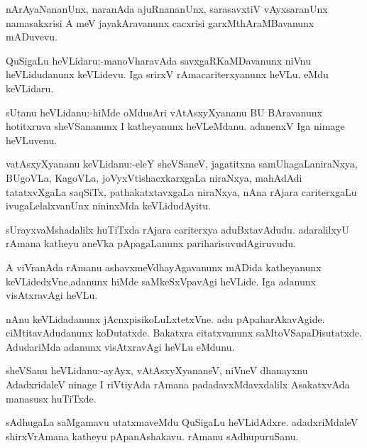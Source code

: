 \documentclass{article}
\begin{document}
\begin{mn}%
nArAyaNananUnx, naranAda ajuRnananUnx, sarasavxtiV vAyxsaranUnx namasakxrisi A meV 
jayakAravanunx cacxrisi garxMthAraMBavanunx mADuvevu.
\end{mn}

\begin{mn}%
QuSigaLu heVLidaru:-manoVharavAda savxgaRKaMDavanunx niVnu heVLidudanunx 
keVLidevu. Iga srirxV rAmacariterxyanunx heVLu. eMdu keVLidaru.
\end{mn}

\begin{mn}%
sUtanu heVLidanu:-hiMde oMdusAri vAtAsxyXyananu BU BAravanunx hotitxruva 
sheVSananunx I katheyanunx heVLeMdanu. adanenxV Iga nimage heVLuvenu.
\end{mn}

\begin{mn}%
vatAsxyXyananu keVLidanu:-eleY sheVSaneV, jagatitxna samUhagaLaniraNxya, BUgoVLa, 
KagoVLa, joVyxVtishacxkarxgaLa niraNxya, mahAdAdi tatatxvXgaLa saqSiTx, 
pathakatxtavxgaLa niraNxya, nAna rAjara cariterxgaLu ivugaLelalxvanUnx nininxMda 
keVLidudAyitu.
\end{mn}

\begin{mn}%
sUrayxvaMshadalilx huTiTxda rAjara cariterxya aduBxtavAdudu. adaralilxyU rAmana 
katheyu aneVka pApagaLanunx pariharisuvudAgiruvudu.
\end{mn}

\begin{mn}%
A viVranAda rAmanu ashavxmeVdhayAgavanunx mADida katheyanunx keVLidedxVne.adanunx 
hiMde saMkeSxVpavAgi heVLide. Iga adanunx visAtxravAgi heVLu.
\end{mn}

\begin{mn}%
nAnu keVLidadanunx jAcnxpisikoLuLxtetxVne. adu pApaharAkavAgide. 
ciMtitavAdudanunx koDutatxde. Bakatxra citatxvanunx saMtoVSapaDisutatxde. 
AdudariMda adanunx visAtxravAgi heVLu eMdunu.
\end{mn}

\begin{mn}%
sheVSanu heVLidanu:-ayAyx, vAtAsxyXyananeV, niVneV dhanayxnu AdadxridaleV ninage I 
riVtiyAda rAmana padadavxMdavxdalilx AsakatxvAda manasusx huTiTxde.
\end{mn}

\begin{mn}%
sAdhugaLa saMgamavu utatxmaveMdu QuSigaLu heVLidAdxre. adadxriMdaleV shirxVrAmana 
katheyu pApanAshakavu. rAmanu sAdhupuruSanu. 
\end{mn}
\end{document}

